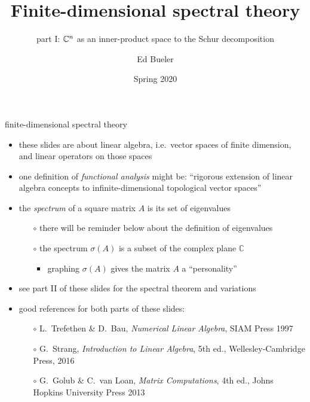 \documentclass[10pt,hyperref]{beamer}
\title{Finite-dimensional spectral theory}
\subtitle{part I: $\CC^n$ as an inner-product space to the Schur decomposition}
\author{Ed Bueler}
\institute[MATH 617]{MATH 617 Functional Analysis}
\date{Spring 2020}
\newcommand{\CC}{\mathbb{C}}
\begin{document}
\beamertemplatenavigationsymbolsempty

\begin{frame}
  \maketitle
\end{frame}


\begin{frame}{finite-dimensional spectral theory}

\begin{itemize}
\item these slides are about linear algebra, i.e.~vector spaces of finite dimension, and linear operators on those spaces
\item one definition of \emph{functional analysis} might be: ``rigorous extension of linear algebra concepts to infinite-dimensional topological vector spaces''
\item the \emph{spectrum} of a square matrix $A$ is its set of eigenvalues
    \begin{itemize}
    \item[$\circ$] there will be reminder below about the definition of eigenvalues
    \item[$\circ$] the spectrum $\sigma(A)$ is a subset of the complex plane $\CC$
        \begin{itemize}
        \item graphing $\sigma(A)$ gives the matrix $A$ a ``personality''
        \end{itemize}
    \end{itemize}
\item see part II of these slides for the spectral theorem and variations
\item good references for both parts of these slides:
    \begin{itemize}
    \item[$\circ$] L.~Trefethen \& D.~Bau, \emph{Numerical Linear Algebra}, SIAM Press 1997
    \item[$\circ$] G.~Strang, \emph{Introduction to Linear Algebra}, 5th ed., Wellesley-Cambridge Press, 2016
    \item[$\circ$] G.~Golub \& C.~van Loan, \emph{Matrix Computations}, 4th ed., Johns Hopkins University Press 2013
    \end{itemize}

\end{itemize}
\end{frame}
\end{document}
